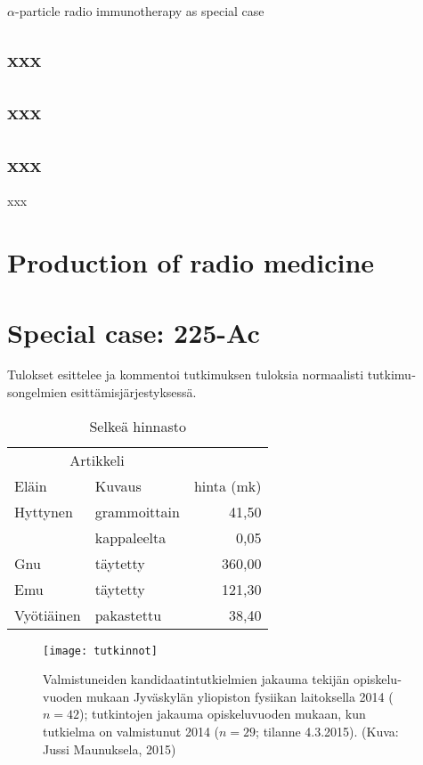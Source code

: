 \documentclass[final]{jyflluk}
\begin{document}
\begin{otherlanguage}{english}
$\alpha$-particle radio immunotherapy as special case
\subsection{xxx}
\label{sec:xxx2}

\subsection{xxx}
\label{sec:xxx3}

\subsection{xxx}
\label{sec:xxx4}

xxx

\section{Production of radio medicine}
\label{sec:production}



\section{Special case: 225-Ac}
\label{sec:tulokset}

Tulokset esittelee ja kommentoi tutkimuksen tuloksia normaalisti tutkimusongelmien esittämisjärjestyksessä.

\begin{table}[h]
   \centering
   \caption{Selkeä hinnasto}
   \begin{tabular}{llr} \toprule
      \multicolumn{2}{c}{Artikkeli} \\ \cmidrule(r){1-2}
      Eläin    & Kuvaus       & hinta (mk) \\ \midrule
      Hyttynen & grammoittain &  41,50 \\
               & kappaleelta  &   0,05 \\
							
      Gnu      & täytetty     & 360,00 \\
      Emu      & täytetty     & 121,30 \\
      Vyötiäinen & pakastettu &  38,40 \\ \bottomrule
   \end{tabular}
\end{table}

\begin{figure}[htp]
   \centering
   \texttt{[image: tutkinnot]}
   \caption{Valmistuneiden kandidaatintutkielmien jakauma tekijän opiskeluvuoden mukaan Jyväskylän yliopiston fysiikan laitoksella 2014 ($n = 42$); tutkintojen jakauma opiskeluvuoden mukaan, kun tutkielma on valmistunut 2014 ($n = 29$; tilanne 4.3.2015). (Kuva: Jussi Maunuksela, 2015)}
   \label{fig:esim-kuvio}
\end{figure}


\end{otherlanguage}
\end{document}
